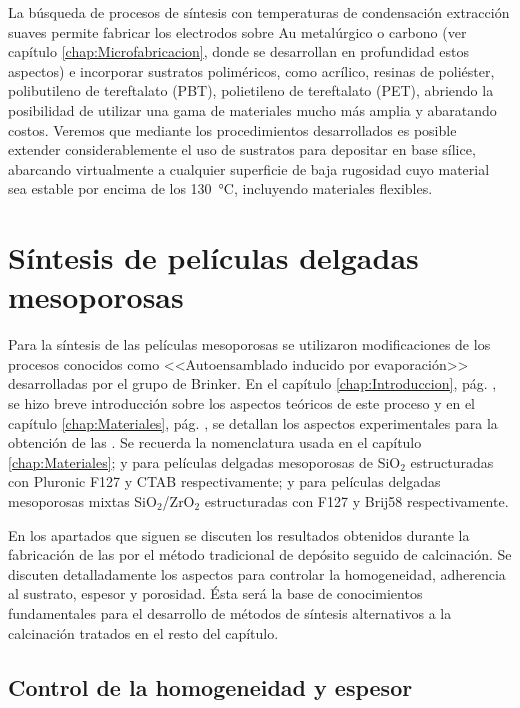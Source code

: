 	La búsqueda de procesos de síntesis con temperaturas de condensación extracción suaves permite fabricar los electrodos sobre Au metalúrgico o carbono (ver capítulo \ref{chap:Microfabricacion}, donde se desarrollan en profundidad estos aspectos) e incorporar sustratos poliméricos, como acrílico, resinas de poliéster, polibutileno de tereftalato (PBT), polietileno de tereftalato (PET), abriendo la posibilidad de utilizar una gama de materiales mucho más amplia y abaratando costos. Veremos que mediante los procedimientos desarrollados es posible extender considerablemente el uso de sustratos para depositar \pdm\space en base sílice, abarcando virtualmente a cualquier superficie de baja rugosidad cuyo material sea estable por encima de los \SI{130}{\celsius}, incluyendo materiales flexibles.
	
\section{Síntesis de películas delgadas mesoporosas}
		
		Para la síntesis de las películas mesoporosas se utilizaron modificaciones de los procesos conocidos como <<Autoensamblado inducido por evaporación>> desarrolladas por el grupo de Brinker.\cite{Brinker1999} En el capítulo \ref{chap:Introduccion}, pág. \pageref{sec:mesoporosos}, se hizo breve introducción sobre los aspectos teóricos de este proceso y en el capítulo \ref{chap:Materiales}, pág. \pageref{sec:sintesis_mesoporosos}, se detallan los aspectos experimentales para la obtención de las \pdm. Se recuerda la nomenclatura usada en el capítulo \ref{chap:Materiales}; \pdmF\space y \pdmC\space para películas delgadas mesoporosas de SiO$_2$ estructuradas con Pluronic F127 y CTAB respectivamente; \pdmZ\space y \pdmZB\space para películas delgadas mesoporosas mixtas SiO$_2$/ZrO$_2$ estructuradas con F127 y Brij58 respectivamente.

		En los apartados que siguen se discuten los resultados obtenidos durante la fabricación de las \pdm\space por el método tradicional de depósito seguido de calcinación. Se discuten detalladamente los aspectos para controlar la homogeneidad, adherencia al sustrato, espesor y porosidad. Ésta será la base de conocimientos fundamentales para el desarrollo de métodos de síntesis alternativos a la calcinación tratados en el resto del capítulo.

	\subsection{Control de la homogeneidad y espesor}
		
